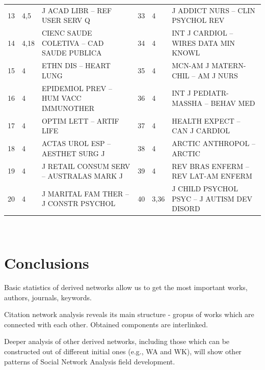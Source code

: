 \documentclass[11pt]{article} %
\begin{document}
\begin{table}
\begin{tabular}{c|l|p{6cm}||c|l|p{6cm}|}
13&	4,5&	J ACAD LIBR --  REF USER SERV Q    &	33&	4&	J ADDICT NURS --  CLIN PSYCHOL REV     \\
14&	4,18&	CIENC SAUDE COLETIVA --  CAD SAUDE PUBLICA     &	34&	4&	INT J CARDIOL --  WIRES DATA MIN KNOWL    \\
15&	4&	ETHN DIS --  HEART LUNG       &	35&	4&	MCN-AM J MATERN-CHIL --  AM J NURS     \\
16&	4&	EPIDEMIOL PREV --  HUM VACC IMMUNOTHER      &	36&	4&	INT J PEDIATR-MASSHA --  BEHAV MED      \\
17&	4&	OPTIM LETT --  ARTIF LIFE       &	37&	4&	HEALTH EXPECT --  CAN J CARDIOL      \\
18&	4&	ACTAS UROL ESP --  AESTHET SURG J     &	38&	4&	ARCTIC ANTHROPOL --  ARCTIC        \\
19&	4&	J RETAIL CONSUM SERV --  AUSTRALAS MARK J    &	39&	4&	REV BRAS ENFERM --  REV LAT-AM ENFERM     \\
20&	4&	J MARITAL FAM THER --  J CONSTR PSYCHOL    &	40&	3,36&	J CHILD PSYCHOL PSYC --  J AUTISM DEV DISORD   \\ \hline 
\end{tabular}\\
\end{table}  


\section{Conclusions}

Basic statistics of derived networks allow us to get the most important works, authors, journals, keywords. \medskip

Citation network analysis reveals its main structure - gropus of works which are connected with each other. Obtained components are interlinked. \medskip

Deeper analysis of other derived networks, including those which can be constructed out of different initial ones (e.g., WA and WK), will show other patterns of Social Network Analysis field development. 


\end{document}
